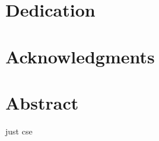 \documentclass{thesis-library}
\begin{document}
\newcommand{\thesisTitle}{[Thesis Title]}
\newcommand{\byLabel}{Submitted By:}
\newcommand{\studentID}{[Student ID]}
\newcommand{\studentRegYear}{[Registration Year:]}
\newcommand{\studentAcaYear}{[Academic Year:]}
\newcommand{\studentName}{[Student Name]}
\newcommand{\supervisorLabel}{Supervisor:}
\newcommand{\supervisorName}{[Supervisor Name]}
\newcommand{\supervisorDesig}{[Supervisor Designation]}
\newcommand{\supervisorAff}{[Supervisor Affiliation]}
\newcommand{\coSupervisorLabel}{Co-Supervisor:}
\newcommand{\coSupervisorName}{[Co-supervisor Name]}
\newcommand{\cosupervisorDesig}{[Co-supervisor Designation]}
\newcommand{\cosupervisorAff}{[Co-supervisor Affiliation]}
\newcommand{\degreeLineALabel}{This thesis report was submitted in partial fulfillment of the}
\newcommand{\degreeLineBLabel}{Requirements for the Master’s Degree}
\newcommand{\majorName}{In \textbf{[Department name]}}
\newcommand{\facultyName}{[Faculty name]}
\newcommand{\universityName}{Jashore University of Science and Technology}
\newcommand{\regionName}{Jashore-7408, Bangladesh}
\newcommand{\degreeyearName}{[2023]}
\newcommand{\degreemonthName}{[February]}
\newcommand{\approvalText}{[Thesis approval text]}
\newcommand{\studentSign}{\underline{Signature of the Student}}

\newcommand{\supervisorSign}{\underline{Signature of the Supervisor}}

\newcommand{\cosupervisorSign}{\underline{Signature of the Co-Supervisor}}

\makecoverpage

\makeapprovalpage


\chapter*{Dedication}
\lipsum[1]

\chapter*{Acknowledgments}
\lipsum[2-3]

\newpage
\listofabbreviations

\tableofcontents

\newpage
\listoffigures

\newpage
\listoftables

\chapter*{Abstract}
\Gls{just} 
\lipsum[4-5]
\Gls{cse}
\end{document}
